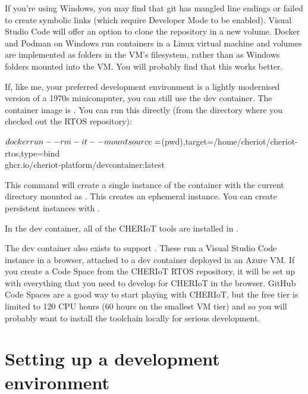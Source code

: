 \begin{caution}
	If you're using Windows, you may find that git has mangled line endings or failed to create symbolic links (which require Developer Mode to be enabled).
	Visual Studio Code will offer an option to clone the repository in a new volume.
	Docker and Podman on Windows run containers in a Linux virtual machine and volumes are implemented as folders in the VM's filesystem, rather than as Windows folders mounted into the VM.
	You will probably find that this works better.
\end{caution}

If, like me, your preferred development environment is a lightly modernised version of a 1970s minicomputer, you can still use the dev container.
The container image is .
You can run this directly (from the directory where you checked out the RTOS repository):

\begin{console}
$ docker run --rm -it \\
	--mount source=$(pwd),target=/home/cheriot/cheriot-rtos,type=bind \\
	ghcr.io/cheriot-platform/devcontainer:latest
\end{console}

This command will create a single instance of the container with the current directory mounted as .
This creates an ephemeral instance. 
You can create persistent instances with .

In the dev container, all of the CHERIoT tools are installed in .

\begin{note}
	The dev container also exists to support .
	These run a Visual Studio Code instance in a browser, attached to a dev container deployed in an Azure VM.
	If you create a Code Space from the CHERIoT RTOS repository, it will be set up with everything that you need to develop for CHERIoT in the browser.
	GitHub Code Spaces are a good way to start playing with CHERIoT, but the free tier is limited to 120 CPU hours (60 hours on the smallest VM tier) and so you will probably want to install the toolchain locally for serious development.
\end{note}

\section{Setting up a development environment}

